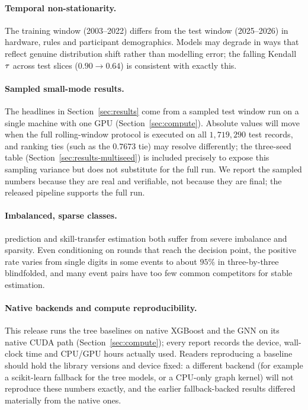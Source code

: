 \paragraph{Temporal non-stationarity.} The training window (2003--2022) differs
from the test window (2025--2026) in hardware, rules and participant
demographics. Models may degrade in ways that reflect genuine distribution
shift rather than modelling error; the falling  Kendall $\tau$
across test slices ($0.90 \to 0.64$) is consistent with exactly this.

\paragraph{Sampled small-mode results.} The headlines in
Section~\ref{sec:results} come from a sampled test window run on a single
machine with one GPU (Section~\ref{sec:compute}). Absolute values will move
when the full rolling-window protocol is executed on all $1{,}719{,}290$ test
records, and ranking ties (such as the  $0.7673$ tie) may resolve
differently; the three-seed table (Section~\ref{sec:results-multiseed}) is
included precisely to expose this sampling variance but does not substitute for
the full run. We report the sampled numbers because they are real and
verifiable, not because they are final; the released pipeline supports the full
run.

\paragraph{Imbalanced, sparse classes.} \DNF{} prediction and skill-transfer
estimation both suffer from severe imbalance and sparsity. Even conditioning on
rounds that reach the decision point, the positive rate varies from single
digits in some events to about $95\%$ in three-by-three blindfolded, and many
event pairs have too few common competitors for stable estimation.

\paragraph{Native backends and compute reproducibility.} This release runs the
tree baselines on native XGBoost and the GNN on its native CUDA path
(Section~\ref{sec:compute}); every report records the device, wall-clock time
and CPU/GPU hours actually used. Readers reproducing a baseline should hold the
library versions and device fixed: a different backend (for example a
scikit-learn fallback for the tree models, or a CPU-only graph kernel) will not
reproduce these numbers exactly, and the earlier fallback-backed results
differed materially from the native ones.

